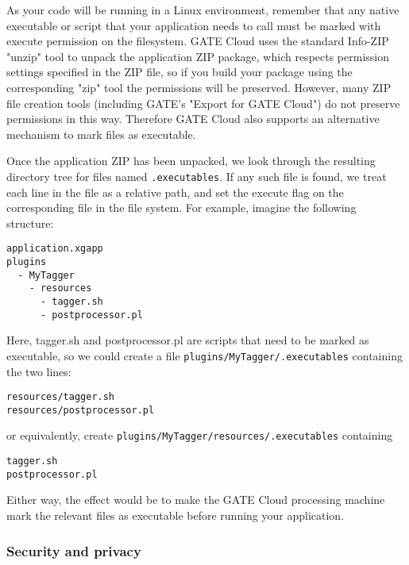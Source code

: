 As your code will be running in a Linux environment, remember that any native
executable or script that your application needs to call must be marked with
execute permission on the filesystem.  GATE Cloud uses the standard Info-ZIP
"unzip" tool to unpack the application ZIP package, which respects permission
settings specified in the ZIP file, so if you build your package using the
corresponding "zip" tool the permissions will be preserved.  However, many ZIP
file creation tools (including GATE's "Export for GATE Cloud") do not preserve
permissions in this way.  Therefore GATE Cloud also supports an alternative
mechanism to mark files as executable.

Once the application ZIP has been unpacked, we look through the resulting
directory tree for files named \verb^.executables^.  If any such file is found,
we treat each line in the file as a relative path, and set the execute flag on
the corresponding file in the file system.  For example, imagine the following
structure:

\begin{small}
\begin{verbatim}
application.xgapp
plugins
  - MyTagger
    - resources
      - tagger.sh
      - postprocessor.pl
\end{verbatim}
\end{small}

Here, tagger.sh and postprocessor.pl are scripts that need to be marked as
executable, so we could create a file \verb^plugins/MyTagger/.executables^
containing the two lines:

\begin{small}
\begin{verbatim}
resources/tagger.sh
resources/postprocessor.pl
\end{verbatim}
\end{small}

or equivalently, create \verb^plugins/MyTagger/resources/.executables^ containing

\begin{small}
\begin{verbatim}
tagger.sh
postprocessor.pl
\end{verbatim}
\end{small}

Either way, the effect would be to make the GATE Cloud processing machine
mark the relevant files as executable before running your application.

\subsubsection{Security and privacy}

